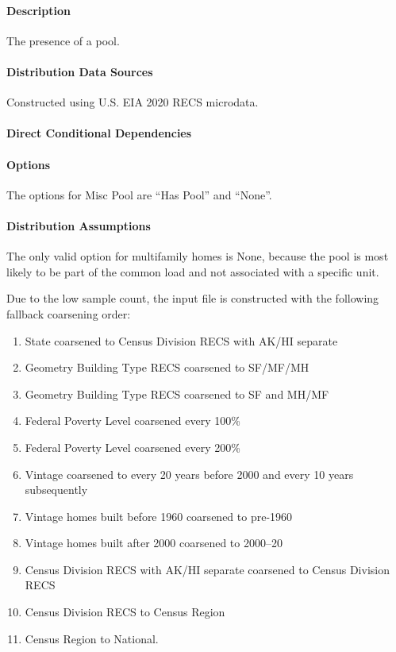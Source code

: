 \paragraph{Description}
% 
The presence of a pool.

\paragraph{Distribution Data Sources}
% 
Constructed using U.S. EIA 2020 RECS microdata. 

\paragraph{Direct Conditional Dependencies}


\paragraph{Options}
The options for Misc Pool are ``Has Pool'' and ``None''.

\paragraph{Distribution Assumptions}
% 
The only valid option for multifamily homes is None, because the pool is most likely to be part of the common load and not associated with a specific unit. 

Due to the low sample count, the input file is constructed with the following fallback coarsening order: 
\begin{enumerate}
    \item State coarsened to Census Division RECS with AK/HI separate 
    \item  Geometry Building Type RECS coarsened to SF/MF/MH 
    \item  Geometry Building Type RECS coarsened to SF and MH/MF 
    \item  Federal Poverty Level coarsened every 100\% 
    \item Federal Poverty Level coarsened every 200\% 
    \item Vintage coarsened to every 20 years before 2000 and every 10 years subsequently 
    \item  Vintage homes built before 1960 coarsened to pre-1960 
    \item Vintage homes built after 2000 coarsened to 2000--20 
    \item Census Division RECS with AK/HI separate coarsened to Census Division RECS 
    \item Census Division RECS to Census Region 
    \item Census Region to National.
\end{enumerate}
